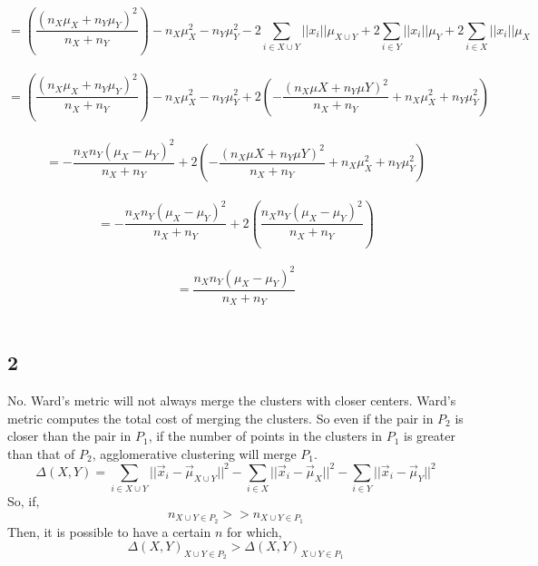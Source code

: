 \documentclass[paper=a4, fontsize=11pt]{scrartcl} %
\numberwithin{figure}{section} %
\numberwithin{table}{section} %
\begin{document}
$$
= \left( \frac{(n_{X}\mu_{X}+n_{Y}\mu_{Y})^{2}}{n_{X}+n_{Y}}\right) - n_{X}\mu_{X}^{2} - n_{Y} \mu_{Y}^{2} - 2 \sum_{i \in X \cup Y}||x_{i}||\mu_{X \cup Y} + 2 \sum_{i \in Y}||x_{i}||\mu_{Y} + 2 \sum_{i \in X}||x_{i}||\mu_{X}
$$
\\
$$
= \left( \frac{(n_{X}\mu_{X}+n_{Y}\mu_{Y})^{2}}{n_{X}+n_{Y}}\right) - n_{X}\mu_{X}^{2} - n_{Y} \mu_{Y}^{2} + 2\left( -\frac{(n_{X}\mu{X}+n_{Y}\mu{Y})^{2}}{n_{X}+n_{Y}} + n_{X}\mu_{X}^{2}  + n_{Y}\mu_{Y}^{2}\right)
$$
\\
$$
= -\frac{n_{X}n_{Y}(\mu_{X}-\mu_{Y})^{2}}{n_{X}+n_{Y}} + 2\left( -\frac{(n_{X}\mu{X}+n_{Y}\mu{Y})^{2}}{n_{X}+n_{Y}} + n_{X}\mu_{X}^{2}  + n_{Y}\mu_{Y}^{2}\right)
$$
\\
$$
= -\frac{n_{X}n_{Y}(\mu_{X}-\mu_{Y})^{2}}{n_{X}+n_{Y}} + 2\left( \frac{n_{X}n_{Y}(\mu_{X}-\mu_{Y})^{2}}{n_{X}+n_{Y}}\right)
$$
\\
$$
= \frac{n_{X}n_{Y}(\mu_{X}-\mu_{Y})^{2}}{n_{X}+n_{Y}}
$$
\\
\subsection*{2}
No. Ward's metric will not always merge the clusters with closer centers. Ward's metric computes the total cost of merging the clusters. So even if the pair in $P_{2}$ is closer than the pair in $P_{1}$, if the number of points in the clusters in $P_{1}$ is greater than that of $P_{2}$, agglomerative clustering will merge $P_{1}$.
$$
\Delta(X, Y) = \sum_{i \in X \cup Y} ||\vec{x}_i - \vec{\mu}_{X \cup Y} ||^2 - \sum_{i \in X} || \vec{x}_i - \vec{\mu}_X ||^2 - \sum_{i \in Y} || \vec{x}_i - \vec{\mu}_Y ||^2
$$
So, if,
$$
n_{X \cup Y \in P_{2}} >> n_{X \cup Y \in P_{1}}
$$
Then, it is possible to have a certain $n$ for which,
$$
\Delta(X, Y)_{X \cup Y \in P_{2}} > \Delta(X, Y)_{X \cup Y \in P_{1}}
$$
\end{document}
